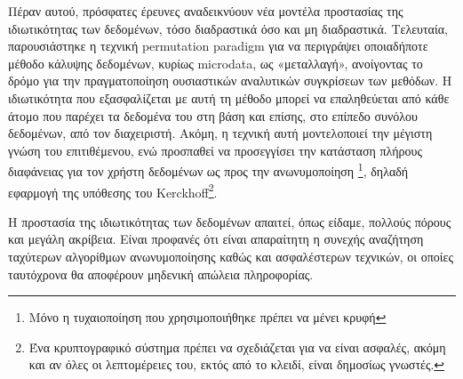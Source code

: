 Πέραν αυτού, πρόσφατες έρευνες αναδεικνύουν νέα μοντέλα προστασίας της ιδιωτικότητας των δεδομένων, τόσο διαδραστικά όσο και μη διαδραστικά. 
Τελευταία, παρουσιάστηκε η τεχνική \textlatin{permutation paradigm} για να περιγράψει οποιαδήποτε μέθοδο κάλυψης δεδομένων, κυρίως \textlatin{microdata}, ως «μεταλλαγή», ανοίγοντας το δρόμο για την πραγματοποίηση ουσιαστικών αναλυτικών συγκρίσεων των μεθόδων\textlatin{\cite{domingo2016new}}. 
Η ιδιωτικότητα που εξασφαλίζεται με αυτή τη μέθοδο μπορεί να επαληθεύεται από κάθε άτομο που παρέχει τα δεδομένα του στη βάση και επίσης, στο επίπεδο συνόλου δεδομένων, από τον διαχειριστή\textlatin{\cite{ruiz2018some}}. 
Ακόμη, η τεχνική αυτή μοντελοποιεί την μέγιστη γνώση του επιτιθέμενου, ενώ προσπαθεί να προσεγγίσει την κατάσταση πλήρους διαφάνειας για τον χρήστη δεδομένων ως προς την ανωνυμοποίηση \footnote{Μόνο η τυχαιοποίηση που χρησιμοποιήθηκε πρέπει να μένει κρυφή}, δηλαδή εφαρμογή της υπόθεσης του \textlatin{Kerckhoff}\footnote{Ένα κρυπτογραφικό σύστημα πρέπει να σχεδιάζεται για να είναι ασφαλές, ακόμη και αν όλες οι λεπτομέρειες του, εκτός από το κλειδί, είναι δημοσίως γνωστές.
}.







Η προστασία της ιδιωτικότητας των δεδομένων απαιτεί, όπως είδαμε, πολλούς πόρους και μεγάλη ακρίβεια. Είναι προφανές ότι είναι απαραίτητη η συνεχής αναζήτηση ταχύτερων αλγορίθμων ανωνυμοποίησης καθώς και ασφαλέστερων τεχνικών, οι οποίες ταυτόχρονα θα αποφέρουν μηδενική απώλεια πληροφορίας. 